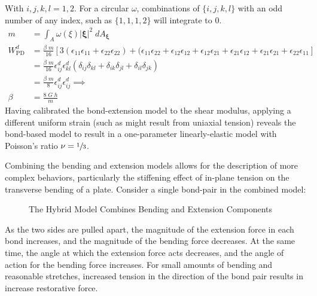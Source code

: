 \documentclass[preprint,review,12pt]{elsarticle}
\newcommand{\diagrampath}{./diagrams}
\begin{document}
%
With $i, j, k, l = 1,2$. For a circular $\omega$, combinations of $\{i,j,k,l\}$ with an odd number of any index, such as $\{1,1,1,2\}$ will integrate to 0.
%
\begin{align*}
    m &= \int_A \omega(\xi)|\boldsymbol{\xi}|^2\; dA_{\boldsymbol{\xi}} \\
    W^d_\text{PD} &= \frac{\beta \; m}{16}[3(\epsilon_{11}\epsilon_{11}+\epsilon_{22}\epsilon_{22})+(\epsilon_{11}\epsilon_{22}+\epsilon_{12}\epsilon_{12}+\epsilon_{12}\epsilon_{21}+\epsilon_{21}\epsilon_{12}+\epsilon_{21}\epsilon_{21}+\epsilon_{22}\epsilon_{11}]\\
    &= \frac{\beta \; m}{16} \epsilon_{ij}^d \epsilon_{kl}^d (\delta_{ij}\delta_{kl}+\delta_{ik}\delta_{jl}+\delta_{il}\delta_{jk})\\
    &= \frac{\beta \; m}{8} \epsilon_{ij}^d \epsilon_{ij}^d \implies\\
     \beta &= \frac{8 \; G\;h}{m}
\end{align*}
%
Having calibrated the bond-extension model to the shear modulus, applying a different uniform strain (such as might result from uniaxial tension) reveals the bond-based model to result in a one-parameter linearly-elastic model with Poisson's ratio \(\nu=\sfrac{1}{3}\).  

Combining the bending and extension models allows for the description of more complex behaviors, particularly the stiffening effect of in-plane tension on the transverse bending of a plate.  Consider a single bond-pair in the combined model: 
%
\begin{figure}[tbp]
  \label{fig:hybridmodel}
  \centering
  
  \caption{The Hybrid Model Combines Bending and Extension Components}
\end{figure}
%
As the two sides are pulled apart, the magnitude of the extension force in each bond increases, and the magnitude of the bending force decreases.  At the same time, the angle at which the extension force acts decreases, and the angle of action for the bending force increases.  For small amounts of bending and reasonable stretches, increased tension in the direction of the bond pair results in increase restorative force.
\end{document}
